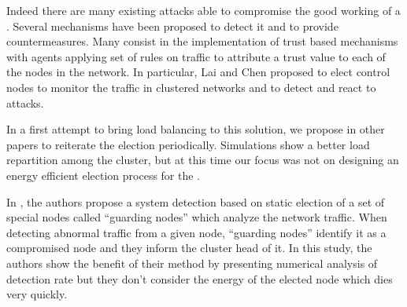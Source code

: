 Indeed there are many existing attacks able to compromise the good working of a \wsn.%
Several mechanisms have been proposed to detect it and to provide countermeasures\cite{SSS11}. %
Many consist in the implementation of trust based mechanisms\cite{MC10,F-GRL07} with agents applying set of rules\cite{RKKK13} on traffic to attribute a trust value to each of the nodes in the network.
In particular, Lai and Chen\cite{LC08} proposed to elect control nodes to monitor the traffic in clustered networks and to detect and react to \dos attacks.



In a first attempt to bring load balancing to this solution, we propose in other papers\cite{GMT12,BMM13} to reiterate the election periodically.
Simulations show a better load repartition among the cluster, but at this time our focus was not on designing an energy efficient election process for the \cns.



In
\cite{LC08},
the authors propose a system detection based on static election of a set of special nodes called ``guarding nodes'' which analyze the network traffic.
When detecting abnormal traffic from a given node, ``guarding nodes'' identify it as a compromised node and they inform the cluster head of it.
In this study, the authors show the benefit of their method by presenting numerical analysis of detection rate but they don't consider the energy of the elected node which dies very quickly.


